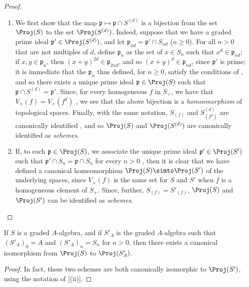 \begin{proof}
\medskip\noindent
\begin{enumerate}
  \item[{\rm(i)}] We first show that the map $\mathfrak{p}\mapsto\mathfrak{p}\cap S^{(d)}$ is a bijection from the set $\Proj(S)$ to the set $\Proj(S^{(d)})$.
    Indeed, suppose that we have a graded prime ideal $\mathfrak{p}'\in\Proj(S^{(d)})$, and let $\mathfrak{p}_{nd}=\mathfrak{p}'\cap S_{nd}$ ($n\geq0$).
    For all $n>0$ that are not multiples of $d$, define $\mathfrak{p}_n$ as the set of $x\in S_n$ such that $x^d\in\mathfrak{p}_{nd}$;
    if $x,y\in\mathfrak{p}_n$, then $(x+y)^{2d}\in\mathfrak{p}_{2nd}$, and so $(x+y)^d\in\mathfrak{p}_{nd}$, since $\mathfrak{p}'$ is prime;
    it is immediate that the $\mathfrak{p}_n$ thus defined, for $n\geq0$, satisfy the conditions of , and so there exists a unique prime ideal $\mathfrak{p}\in\Proj(S)$ such that $\mathfrak{p}\cap S^{(d)}=\mathfrak{p}'$.
    Since, for every homogeneous $f$ in $S_+$, we have that $V_+(f)=V_+(f^d)$ , we see that the above bijection is a \emph{homeomorphism} of topological spaces.
    Finally, with the same notation, $S_{(f)}$ and $S^{(d)}_{(f^d)}$ are canonically identified , and so $\Proj(S)$ and $\Proj(S^{(d)})$ are canonically identified as \emph{schemes}.
  \item[{\rm(ii)}] If, to each $\mathfrak{p}\in\Proj(S)$, we associate the unique prime ideal $\mathfrak{p}'\in\Proj(S')$ such that $\mathfrak{p}'\cap S_n=\mathfrak{p}\cap S_n$ for every $n>0$ , then it is clear that we have defined a canonical homeomorphism $\Proj(S)\simto\Proj(S')$ of the underlying spaces, since $V_+(f)$ is the same set for $S$ and $S'$ when $f$ is a homogeneous element of $S_+$.
  Since, further, $S_{(f)}=S'_{(f)}$, $\Proj(S)$ and $\Proj(S')$ can be identified as \emph{schemes}.
\end{enumerate}
\end{proof}

\begin{corollary}[2.4.8]
\label{II.2.4.8}
If $S$ is a graded $A$-algebra, and if $S'_A$ is the graded $A$-algebra such that $(S'_A)_0=A$ and $(S'_A)_n=S_n$ for $n>0$, then there exists a canonical isomorphism from $\Proj(S)$ to $\Proj(S'_A)$.
\end{corollary}

\begin{proof}
In fact, these two schemes are both canonically isomorphic to $\Proj(S')$, using the notation of [(ii)].
\end{proof}



